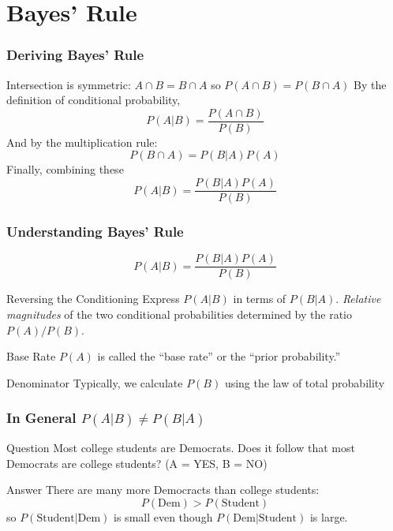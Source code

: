 \documentclass{beamer}
\begin{document}
\section{Bayes' Rule}
\begin{frame}
\frametitle{Deriving Bayes' Rule}
Intersection is symmetric: $A\cap B = B\cap A$ so $P(A\cap B) = P(B \cap A)$ \pause  By the definition of conditional probability,
	$$P(A|B) = \frac{P(A\cap B)}{P(B)}$$ \pause
And by the multiplication rule:
	$$P(B\cap A) = P(B|A)P(A)$$ \pause
Finally, combining these
	$$P(A|B) = \frac{P(B|A)P(A)}{P(B)}$$
\end{frame}
\begin{frame}
\frametitle{Understanding Bayes' Rule}
$$\boxed{P(A|B) = \frac{P(B|A)P(A)}{P(B)}}$$

\begin{block}
	{Reversing the Conditioning}
	Express $P(A|B)$ in terms of $P(B|A)$. \emph{Relative magnitudes} of the two conditional probabilities determined by the ratio $P(A)/P(B)$.
\end{block}

\begin{block}
	{Base Rate}
	$P(A)$ is called the ``base rate'' or the ``prior probability.'' 
\end{block}

\begin{block}
	{Denominator}
	Typically, we calculate $P(B)$ using the law of total probability
\end{block}


\end{frame}
\begin{frame}
\frametitle{In General $P(A|B) \neq P(B|A)$ } 
\begin{block}{Question}
Most college students are Democrats. Does it follow that most Democrats are college students?  \hfill  \alert{(A = YES, B = NO)}
\end{block}

\pause

\begin{block}{Answer}
There are many more Democracts than college students: 
$$P(\mbox{Dem}) > P(\mbox{Student})$$ 
so $P(\mbox{Student}|\mbox{Dem})$ is small even though $P(\mbox{Dem}|\mbox{Student})$ is large.
\end{block}
\end{frame}
\end{document}
